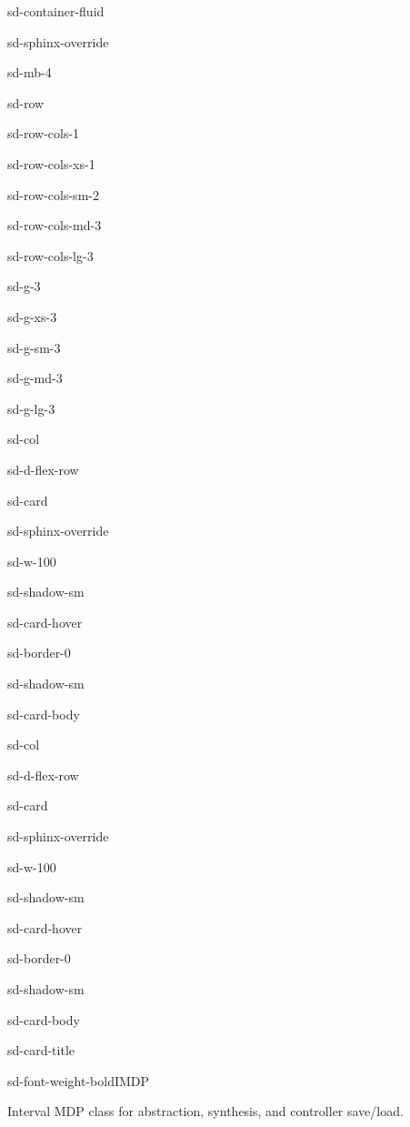 \documentclass[a4paper,10pt,english]{sphinxmanual}
\begin{document}
\begin{sphinxuseclass}{sd-container-fluid}
\begin{sphinxuseclass}{sd-sphinx-override}
\begin{sphinxuseclass}{sd-mb-4}
\begin{sphinxuseclass}{sd-row}
\begin{sphinxuseclass}{sd-row-cols-1}
\begin{sphinxuseclass}{sd-row-cols-xs-1}
\begin{sphinxuseclass}{sd-row-cols-sm-2}
\begin{sphinxuseclass}{sd-row-cols-md-3}
\begin{sphinxuseclass}{sd-row-cols-lg-3}
\begin{sphinxuseclass}{sd-g-3}
\begin{sphinxuseclass}{sd-g-xs-3}
\begin{sphinxuseclass}{sd-g-sm-3}
\begin{sphinxuseclass}{sd-g-md-3}
\begin{sphinxuseclass}{sd-g-lg-3}
\begin{sphinxuseclass}{sd-col}
\begin{sphinxuseclass}{sd-d-flex-row}
\begin{sphinxuseclass}{sd-card}
\begin{sphinxuseclass}{sd-sphinx-override}
\begin{sphinxuseclass}{sd-w-100}
\begin{sphinxuseclass}{sd-shadow-sm}
\begin{sphinxuseclass}{sd-card-hover}
\begin{sphinxuseclass}{sd-border-0}
\begin{sphinxuseclass}{sd-shadow-sm}
\begin{sphinxuseclass}{sd-card-body}
\end{sphinxuseclass}{\hyperref[\detokenize{api/mdp::doc}]{}}
\end{sphinxuseclass}
\end{sphinxuseclass}
\end{sphinxuseclass}
\end{sphinxuseclass}
\end{sphinxuseclass}
\end{sphinxuseclass}
\end{sphinxuseclass}
\end{sphinxuseclass}
\end{sphinxuseclass}
\begin{sphinxuseclass}{sd-col}
\begin{sphinxuseclass}{sd-d-flex-row}
\begin{sphinxuseclass}{sd-card}
\begin{sphinxuseclass}{sd-sphinx-override}
\begin{sphinxuseclass}{sd-w-100}
\begin{sphinxuseclass}{sd-shadow-sm}
\begin{sphinxuseclass}{sd-card-hover}
\begin{sphinxuseclass}{sd-border-0}
\begin{sphinxuseclass}{sd-shadow-sm}
\begin{sphinxuseclass}{sd-card-body}
\begin{sphinxuseclass}{sd-card-title}
\begin{sphinxuseclass}{sd-font-weight-bold}IMDP
\end{sphinxuseclass}
\end{sphinxuseclass}
\sphinxAtStartPar
Interval MDP class for abstraction, synthesis, and controller save/load.


\end{sphinxuseclass}
\end{sphinxuseclass}
\end{sphinxuseclass}
\end{sphinxuseclass}
\end{sphinxuseclass}
\end{sphinxuseclass}
\end{sphinxuseclass}
\end{sphinxuseclass}
\end{sphinxuseclass}
\end{sphinxuseclass}
\end{sphinxuseclass}
\end{sphinxuseclass}
\end{sphinxuseclass}
\end{sphinxuseclass}
\end{sphinxuseclass}
\end{sphinxuseclass}
\end{sphinxuseclass}
\end{sphinxuseclass}
\end{sphinxuseclass}
\end{sphinxuseclass}
\end{sphinxuseclass}
\end{sphinxuseclass}
\end{sphinxuseclass}
\end{sphinxuseclass}
\end{document}
